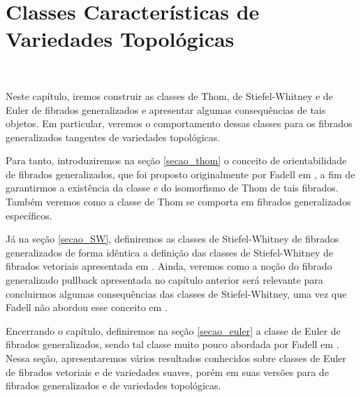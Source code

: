 \documentclass[12pt,oneside]{book} %
\begin{document}





\chapter{Classes Características de Variedades Topológicas}\label{cap_clas_carac}
\thispagestyle{empty}

\

\par Neste capítulo, iremos construir as classes de Thom, de Stiefel-Whitney e de Euler de fibrados generalizados e apresentar algumas consequências de tais objetos. Em particular, veremos o comportamento dessas classes para os fibrados generalizados tangentes de variedades topológicas.

\par Para tanto, introduziremos na seção \ref{secao_thom} o conceito de orientabilidade de fibrados generalizados, que foi proposto originalmente por Fadell em \cite{fadell_1}, a fim de garantirmos a existência da classe e do isomorfismo de Thom de tais fibrados. Também veremos como a classe de Thom se comporta em fibrados generalizados específicos.

\par Já na seção \ref{secao_SW}, definiremos as classes de Stiefel-Whitney de fibrados generalizados de forma idêntica a definição das classes de Stiefel-Whitney de fibrados vetoriais apresentada em \cite{milnor_1}. Ainda, veremos como a noção do fibrado generalizado pullback apresentada no capítulo anterior será relevante para concluirmos algumas consequências das classes de Stiefel-Whitney, uma vez que Fadell não abordou esse conceito em \cite{fadell_1}.

\par Encerrando o capítulo, definiremos na seção \ref{secao_euler} a classe de Euler de fibrados generalizados, sendo tal classe muito pouco abordada por Fadell em \cite{fadell_1}. Nessa seção, apresentaremos vários resultados conhecidos sobre classes de Euler de fibrados vetoriais e de variedades suaves, porém em suas versões para de fibrados generalizados e de variedades topológicas.
\end{document}
